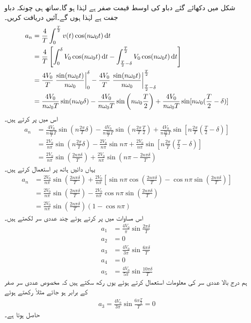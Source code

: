 شکل میں دکھائے گئے دباو کی اوسط قیمت صفر ہے لہٰذا  ہو گا۔ساتھ ہی چونکہ دباو جفت ہے لہٰذا  ہوں گے۔آئیں  دریافت کریں۔
\begin{align*}
a_n&=\frac{4}{T}\int_0^{\frac{T}{2}} v(t)\cos (n\omega_0 t)\dif t\\
&=\frac{4}{T}\left[\int_0^{\delta} V_0\cos(n\omega_0 t) \dif t-\int_{\frac{T}{2}-\delta}^{\frac{T}{2}}V_0 \cos(n\omega_0 t)\dif t\right]\\
&=\frac{4V_0}{T}\left. \frac{\sin(n\omega_0 t)}{n\omega_0}\right|_{0}^{\delta}-\frac{4V_0}{T}\left. \frac{\sin(n\omega_0 t)}{n\omega_0}\right|_{\frac{T}{2}-\delta}^{\frac{T}{2}}\\
&=\frac{4V_0}{n\omega_0 T}\sin(n\omega_0 \delta)-\frac{4V_0}{n\omega_0 T}\sin\left(n\omega_0 \frac{T}{2}\right)+\frac{4V_0}{n\omega_0 T}\sin[n\omega_0 (\frac{T}{2}-\delta)]
\end{align*}
اس میں  پر کرتے ہیں۔
\begin{align*}
a_n&=\frac{4V_0}{n\frac{2\pi}{T} T}\sin(n\frac{2\pi}{T}\delta)-\frac{4V_0}{n\frac{2\pi}{T} T}\sin\left(n\frac{2\pi}{T} \frac{T}{2}\right)+\frac{4V_0}{n\frac{2\pi}{T} T}\sin[n\frac{2\pi}{T} (\frac{T}{2}-\delta)]\\
&=\frac{2V_0}{n\pi}\sin(n\frac{2\pi}{T}\delta)-\frac{2V_0}{n\pi}\sin n\pi+\frac{2V_0}{n\pi}\sin[n\frac{2\pi}{T} (\frac{T}{2}-\delta)]\\
&=\frac{2V_0}{n\pi}\sin\left(\frac{2n\pi\delta}{T}\right)+\frac{2V_0}{n\pi}\sin\left(n\pi-\frac{2n\pi\delta}{T}\right)
\end{align*}
یہاں دائیں ہاتھ پر  استعمال کرتے ہیں۔
\begin{align*}
a_n&=\frac{2V_0}{n\pi}\sin\left(\frac{2n\pi\delta}{T}\right)+\frac{2V_0}{n\pi}\left[\sin n\pi \cos(\frac{2n\pi\delta}{T})-\cos n\pi \sin(\frac{2n\pi\delta}{T})\right]\\
&=\frac{2V_0}{n\pi}\sin\left(\frac{2n\pi\delta}{T}\right)-\frac{2V_0}{n\pi}\cos n\pi \sin(\frac{2n\pi\delta}{T})\\
&=\frac{2V_0}{n\pi}\sin\left(\frac{2n\pi\delta}{T}\right)(1-\cos n\pi)
\end{align*}
اس مساوات میں  پر کرتے ہوئے چند عددی سر لکھتے ہیں۔
\begin{align*}
a_1&=\frac{4V_0}{\pi}\sin\frac{2\pi\delta}{T}\\
a_2&=0\\
a_3&=\frac{4V_0}{3\pi}\sin\frac{6\pi\delta}{T}\\
a_4&=0\\
a_5&=\frac{4V_0}{5\pi}\sin\frac{10\pi\delta}{T}
\end{align*}
ہم درج بالا عددی سر کی معلومات استعمال کرتے ہوئے  یوں رکھ سکتے ہیں کہ مخصوص عددی سر صفر کے برابر ہو جائے مثلاً  رکھتے ہوئے
\begin{align*}
a_3=\frac{4V_0}{3\pi}\sin\frac{6\pi \frac{T}{3}}{T}=0
\end{align*}
حاصل ہوتا ہے۔
